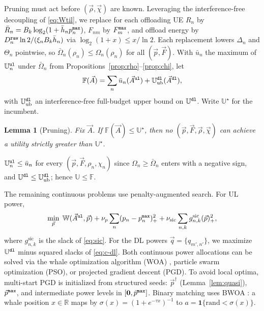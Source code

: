 \documentclass[journal]{IEEEtran}
\newtheorem{lemma}{Lemma}
\begin{document}
{Pruning must act before $(\vec{\rho},\vec{\chi})$ are known. Leveraging the interference-free decoupling of \eqref{eq:Wtil}, we replace for each offloading UE $R_n$ by $\bar R_n=B_k\log_2(1+\bar h_np_n^{\tt max})$, $F_{nm}$ by $F_m^{\tt max}$, and offload energy by $D_n^{\tt raw}\ln2/(\xi_nB_k\bar h_n)$ via $\log_2(1+x)\le x/\ln2$. Each replacement lowers $\Delta_n$ and $\Theta_n$ pointwise, so $\bar\Omega_n(\rho_n)\le\Omega_n(\rho_n)$ for all $(\vec{p},\vec{F})$. With $\bar u_n$ the maximum of $\mathbb{U}_n^{\tt ul}$ under $\bar\Omega_n$ from Propositions~\ref{prop:rho}--\ref{prop:chi}, let}
\begin{equation}
\mathbb{F}(\vec{A})=\sum_{n}\bar u_n(\vec{A}^{\tt ul})+\mathbb{U}^{\tt dl}_{\mathrm{ub}}(\vec{A}^{\tt dl}),
\label{eq:Fbound}
\end{equation}
{with $\mathbb{U}^{\tt dl}_{\mathrm{ub}}$ an interference-free full-budget upper bound on $\mathbb{U}^{\tt dl}$. Write $\mathbb{U}^\star$ for the incumbent.}

\begin{lemma}[Pruning]\label{lem:prune}
{Fix $\vec{A}$. If $\mathbb{F}(\vec{A})\le\mathbb{U}^\star$, then no $(\vec{p},\vec{F},\vec{\rho},\vec{\chi})$ can achieve a utility strictly greater than $\mathbb{U}^\star$.}
\end{lemma}
\begin{IEEEproof}
$\mathbb{U}_n^{\tt ul}\le\bar u_n$ for every $(\vec{p},\vec{F},\rho_n,\chi_n)$ since $\Omega_n\ge\bar\Omega_n$ enters with a negative sign, and $\mathbb{U}^{\tt dl}\le\mathbb{U}^{\tt dl}_{\mathrm{ub}}$; hence $\mathbb{U}\le\mathbb{F}$.
\end{IEEEproof}

The remaining continuous problems use penalty-augmented search. For UL power,
\begin{equation}
\min_{\vec{p}}\;
\mathbb{W}(\vec{A}^{\tt ul},\vec{p})
+\nu_p\sum_n(p_n-p_n^{\tt max})_+^2
+\nu_{\mathrm{sic}}\sum_{n,k}g_{n,k}^{\mathrm{sic}}(\vec{p})_+^2,
\label{eq:mpc}
\end{equation}
where $g_{n,k}^{\mathrm{sic}}$ is the slack of \eqref{eq:sic}. For the DL powers $\vec{q}=\{q_{m',n'}\}$, we maximize $\mathbb{U}^{\tt dl}$ minus squared slacks of \eqref{eq:c-dl}. 
{Both continuous power allocations can be solved via the whale optimization algorithm (WOA) \cite{mirjalili2016whale}, particle swarm optimization (PSO), or projected gradient descent (PGD). To avoid local optima, multi-start PGD is initialized from structured seeds: $\vec{p}^\dagger$ (Lemma~\ref{lem:quasi}), $\vec{p}^{\tt max}$, and intermediate power levels in $[\mathbf{0}, \vec{p}^{\tt max}]$.} 
Binary matching uses BWOA \cite{kumar2020binary}: a whale position $x\in\mathbb{R}$ maps by $\sigma(x)=(1+e^{-\tau x})^{-1}$ to $a=\mathbf{1}\{\mathrm{rand}<\sigma(x)\}$.
\end{document}
